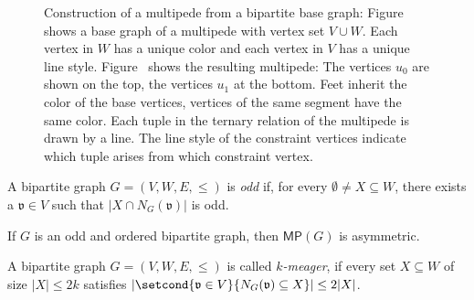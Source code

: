 \documentclass[]{lmcs}
\newcommand{\defining}[1]{\emph{#1}}
\newcommand{\neighbors}[2]{N_{#1}(#2)}
\newcommand{\bVertB}{\mathfrak{v}}
\newcommand{\multipede}[1]{\mathsf{MP}(#1)}
\newcommand{\gadgetsb}{V}
\newcommand{\feetb}{W}
\newcommand{\footbset}{X}
\begin{document}
\begin{figure}
{
	\label{fig:multipede-multipede}
	}
	\caption{Construction of a multipede from a bipartite base graph: Figure~\protect{} shows a base graph of a multipede
		with vertex set $V\cup W$.
	Each vertex in $W$ has a unique color and each vertex in $V$ has a unique line style.
	Figure~\protect{} shows the resulting multipede:
	The vertices $u_0$ are shown on the top, the vertices $u_1$ at the bottom.
	Feet inherit the color of the base vertices, vertices of the same segment have the same color.
	Each tuple in the ternary relation of the multipede is drawn by a line.
	The line style of the constraint vertices indicate which tuple arises from which constraint vertex. 
	}
	\label{fig:multipede}
\end{figure}
 
\begin{defi}
	A bipartite graph $G=(\gadgetsb,\feetb,E, \leq)$ is \defining{odd}
	if, for every $\emptyset\neq \footbset \subseteq \feetb$,
	there exists a $\bVertB \in \gadgetsb$ such that
	$|\footbset \cap \neighbors{G}{\bVertB}|$ is odd.
\end{defi}
\begin{lemC}
	\label{lem:odd-multipede-asymmetric}
	If $G$ is an odd and ordered bipartite graph,
	then $\multipede{G}$ is asymmetric.
\end{lemC}
 
 
\begin{defi}[$k$-Meager]
	A bipartite graph $G=(\gadgetsb,\feetb,E,\leq)$ is called \defining{$k$-meager},
	if every set $\footbset \subseteq \feetb$ of size $|\footbset| \leq 2k$
	satisfies $|\setcond{\bVertB \in \gadgetsb}{\neighbors{G}{\bVertB} \subseteq \footbset}| \leq 2|\footbset|$.
\end{defi} 
\end{document}
